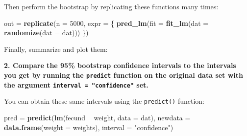 \documentclass[]{book}
\newenvironment{Shaded}{\begin{snugshade}}{\end{snugshade}}
\newcommand{\ControlFlowTok}[1]{\textcolor[rgb]{0.13,0.29,0.53}{\textbf{#1}}}
\newcommand{\DataTypeTok}[1]{\textcolor[rgb]{0.13,0.29,0.53}{#1}}
\newcommand{\DecValTok}[1]{\textcolor[rgb]{0.00,0.00,0.81}{#1}}
\newcommand{\FloatTok}[1]{\textcolor[rgb]{0.00,0.00,0.81}{#1}}
\newcommand{\KeywordTok}[1]{\textcolor[rgb]{0.13,0.29,0.53}{\textbf{#1}}}
\newcommand{\NormalTok}[1]{#1}
\newcommand{\OperatorTok}[1]{\textcolor[rgb]{0.81,0.36,0.00}{\textbf{#1}}}
\newcommand{\StringTok}[1]{\textcolor[rgb]{0.31,0.60,0.02}{#1}}
\begin{document}
Then perform the bootstrap by replicating these functions many times:

\begin{Shaded}
\begin{Highlighting}[]
\NormalTok{out =}\StringTok{ }\KeywordTok{replicate}\NormalTok{(}\DataTypeTok{n =} \DecValTok{5000}\NormalTok{, }\DataTypeTok{expr =}\NormalTok{ \{}
  \KeywordTok{pred_lm}\NormalTok{(}\DataTypeTok{fit =} \KeywordTok{fit_lm}\NormalTok{(}\DataTypeTok{dat =} \KeywordTok{randomize}\NormalTok{(}\DataTypeTok{dat =}\NormalTok{ dat)))}
\NormalTok{\})}
\end{Highlighting}
\end{Shaded}

Finally, summarize and plot them:

\begin{Shaded}
\end{Shaded}

\textbf{2. Compare the 95\% bootstrap confidence intervals to the intervals you get by running the \texttt{predict} function on the original data set with the argument \texttt{interval\ =\ "confidence"} set.}

You can obtain these same intervals using the \texttt{predict()} function:

\begin{Shaded}
\begin{Highlighting}[]
\NormalTok{pred =}\StringTok{ }\KeywordTok{predict}\NormalTok{(}\KeywordTok{lm}\NormalTok{(fecund }\OperatorTok{~}\StringTok{ }\NormalTok{weight, }\DataTypeTok{data =}\NormalTok{ dat),}
               \DataTypeTok{newdata =} \KeywordTok{data.frame}\NormalTok{(}\DataTypeTok{weight =}\NormalTok{ weights),}
               \DataTypeTok{interval =} \StringTok{"confidence"}\NormalTok{)}
\end{Highlighting}
\end{Shaded}
\end{document}
